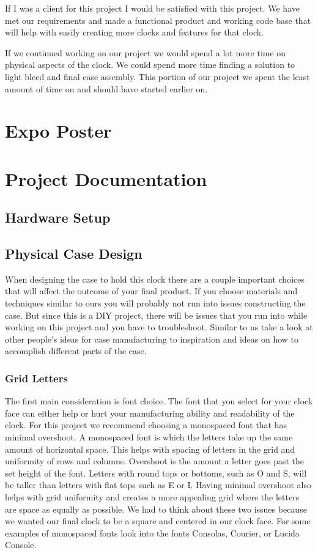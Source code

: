 \documentclass[onecolumn, draftclsnofoot,10pt, compsoc]{IEEEtran}
\begin{document}
If I was a client for this project I would be satisfied with this project. We have met our requirements and made a functional product and working code base that will help with easily creating more clocks and features for that clock.

If we continued working on our project we would spend a lot more time on physical aspects of the clock. We could spend more time finding a solution to light bleed and final case assembly. This portion of our project we spent the least amount of time on and should have started earlier on.

\section{Expo Poster}
\newpage

\section{Project Documentation}
\subsection{Hardware Setup}
\subsection{Physical Case Design}
When designing the case to hold this clock there are a couple important choices that will affect the outcome of your final product. 
If you choose materials and techniques similar to ours you will probably not run into issues constructing the case.
But since this is a DIY project, there will be issues that you run into while working on this project and you have to troubleshoot.
Similar to us take a look at other people's ideas for case manufacturing to inspiration and ideas on how to accomplish different parts of the case.

\subsubsection{Grid Letters}
The first main consideration is font choice.
The font that you select for your clock face can either help or hurt your manufacturing ability and readability of the clock.
For this project we recommend choosing a monospaced font that has minimal overshoot.
A monospaced font is which the letters take up the same amount of horizontal space.
This helps with spacing of letters in the grid and uniformity of rows and columns.
Overshoot is the amount a letter goes past the set height of the font.
Letters with round tops or bottoms, such as O and S, will be taller than letters with flat tops such as E or I.
Having minimal overshoot also helps with grid uniformity and creates a more appealing grid where the letters are space as equally as possible.
We had to think about these two issues because we wanted our final clock to be a square and centered in our clock face.
For some examples of monospaced fonts look into the fonts Consolas, Courier, or Lucida Console.
\end{document}
